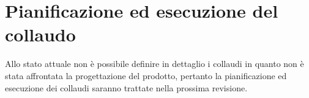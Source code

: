 \section{Pianificazione ed esecuzione del collaudo}
Allo stato attuale non è possibile definire in dettaglio i collaudi in quanto non è stata affrontata la progettazione del prodotto, pertanto la pianificazione ed esecuzione dei collaudi saranno trattate nella prossima revisione.
